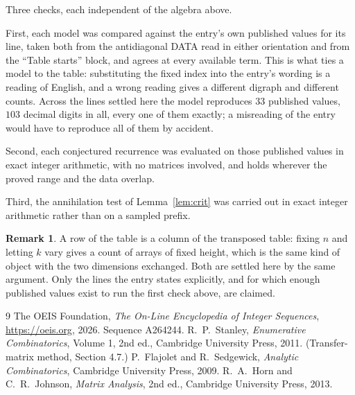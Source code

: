 \documentclass[11pt,a4paper]{article}
\theoremstyle{plain}
\theoremstyle{definition}
\newtheorem{remark}[theorem]{Remark}
\begin{document}
Three checks, each independent of the algebra above.

First, each model was compared against the entry's own published values for its line, taken
both from the antidiagonal DATA read in either orientation and from the ``Table starts''
block, and agrees at every available term. This is what ties a model to the table:
substituting the fixed index into the entry's wording is a reading of English, and a wrong
reading gives a different digraph and different counts. Across the lines settled here the
model reproduces $33$ published values, $103$ decimal digits in all, every one of
them exactly; a misreading of the entry would have to reproduce all of them by accident.

Second, each conjectured recurrence was evaluated on those published values in exact
integer arithmetic, with no matrices involved, and holds wherever the proved range and the
data overlap.

Third, the annihilation test of Lemma~\ref{lem:crit} was carried out in exact integer
arithmetic rather than on a sampled prefix.

\begin{remark}
A row of the table is a column of the transposed table: fixing $n$ and letting $k$ vary gives a
count of arrays of fixed height, which is the same kind of object with the two dimensions
exchanged. Both are settled here by the same argument. Only the lines the entry states
explicitly, and for which enough published values exist to run the first check above, are
claimed.
\end{remark}

\begin{thebibliography}{9}
 The OEIS Foundation, \emph{The On-Line Encyclopedia of Integer
Sequences}, \url{https://oeis.org}, 2026. Sequence A264244.
 R.~P.~Stanley, \emph{Enumerative Combinatorics}, Volume 1, 2nd ed.,
Cambridge University Press, 2011. (Transfer-matrix method, Section 4.7.)
 P.~Flajolet and R.~Sedgewick, \emph{Analytic Combinatorics}, Cambridge
University Press, 2009.
 R.~A.~Horn and C.~R.~Johnson, \emph{Matrix Analysis}, 2nd ed., Cambridge
University Press, 2013.
\end{thebibliography}
\end{document}
